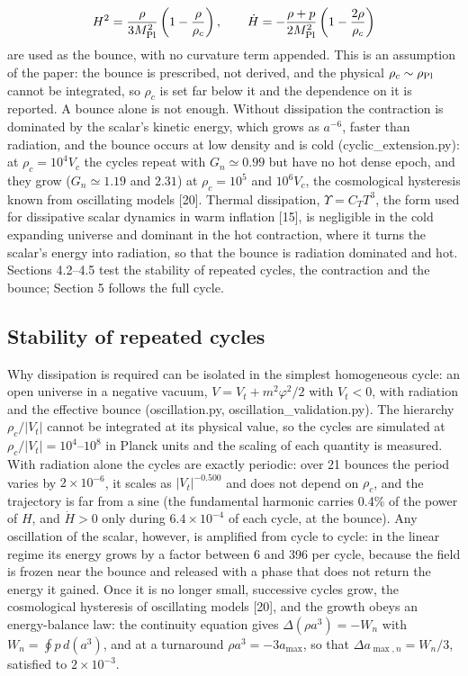 \documentclass[11pt,a4paper]{article}
\begin{document}
\begin{equation}
H^2=\frac{\rho}{3M_{\rm Pl}^2}\left(1-\frac{\rho}{\rho_c}\right),\qquad \dot H=-\frac{\rho+p}{2M_{\rm Pl}^2}\left(1-\frac{2\rho}{\rho_c}\right)
\end{equation}
are used as the bounce, with no curvature term appended. This is an assumption of the paper: the bounce is prescribed, not derived, and the physical $\rho_c\sim\rho_{\rm Pl}$ cannot be integrated, so $\rho_c$ is set far below it and the dependence on it is reported. A bounce alone is not enough. Without dissipation the contraction is dominated by the scalar's kinetic energy, which grows as $a^{-6}$, faster than radiation, and the bounce occurs at low density and is cold (cyclic\_extension.py): at $\rho_c=10^4V_c$ the cycles repeat with $G_n\simeq0.99$ but have no hot dense epoch, and they grow ($G_n\simeq1.19$ and $2.31$) at $\rho_c=10^5$ and $10^6V_c$, the cosmological hysteresis known from oscillating models [20]. Thermal dissipation, $\Upsilon=C_TT^3$, the form used for dissipative scalar dynamics in warm inflation [15], is negligible in the cold expanding universe and dominant in the hot contraction, where it turns the scalar's energy into radiation, so that the bounce is radiation dominated and hot. Sections 4.2--4.5 test the stability of repeated cycles, the contraction and the bounce; Section 5 follows the full cycle.

\subsection{Stability of repeated cycles}
Why dissipation is required can be isolated in the simplest homogeneous cycle: an open universe in a negative vacuum, $V=V_t+m^2\varphi^2/2$ with $V_t<0$, with radiation and the effective bounce (oscillation.py, oscillation\_validation.py). The hierarchy $\rho_c/|V_t|$ cannot be integrated at its physical value, so the cycles are simulated at $\rho_c/|V_t|=10^4$--$10^8$ in Planck units and the scaling of each quantity is measured. With radiation alone the cycles are exactly periodic: over 21 bounces the period varies by $2\times10^{-6}$, it scales as $|V_t|^{-0.500}$ and does not depend on $\rho_c$, and the trajectory is far from a sine (the fundamental harmonic carries 0.4\% of the power of $H$, and $\dot H>0$ only during $6.4\times10^{-4}$ of each cycle, at the bounce). Any oscillation of the scalar, however, is amplified from cycle to cycle: in the linear regime its energy grows by a factor between 6 and 396 per cycle, because the field is frozen near the bounce and released with a phase that does not return the energy it gained. Once it is no longer small, successive cycles grow, the cosmological hysteresis of oscillating models [20], and the growth obeys an energy-balance law: the continuity equation gives $\Delta(\rho a^3)=-W_n$ with $W_n=\oint p\,d(a^3)$, and at a turnaround $\rho a^3=-3a_{\max}$, so that $\Delta a_{\max,n}=W_n/3$, satisfied to $2\times10^{-3}$.
\end{document}
